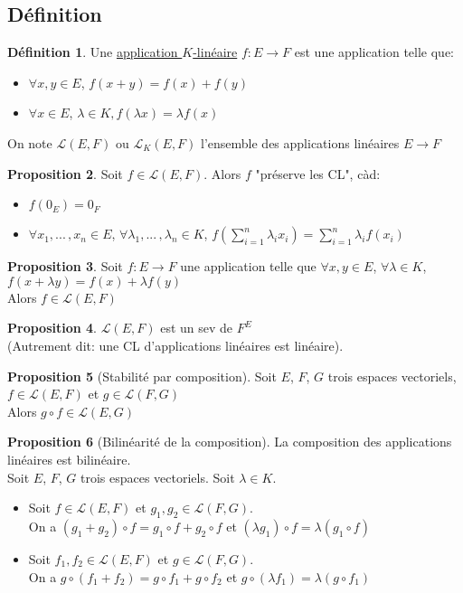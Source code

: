\documentclass[10pt,a4paper]{article}
\theoremstyle{definition}
\newtheorem{proposition}{Proposition}[section]
\newtheorem{definition}[proposition]{Définition}
\begin{document}
\subsection{Définition}
\begin{definition}
Une \uline{application $K$-linéaire} $f: E \to F$ est une application telle que:
\begin{itemize}
\item $\forall x, y \in E$, $f(x + y) = f(x) + f(y)$
\item $\forall x \in E$, $\lambda \in K, f(\lambda x) = \lambda f(x)$
\end{itemize}
On note $\mathcal{L}(E, F)$ ou $\mathcal{L}_K(E, F)$ l'ensemble des applications linéaires $E \to F$
\end{definition}
\begin{proposition}
Soit $f \in \mathcal{L}(E, F)$. Alors $f$ "préserve les CL", càd:
\begin{itemize}
\item $f(0_E) = 0_F$
\item $\forall x_1, ...\, , x_n \in E$, $\forall \lambda_1, ...\, , \lambda_n \in K$, $f(\sum\limits_{i = 1}^{n} \lambda_i x_i ) = \sum\limits_{i = 1}^{n} \lambda_i f(x_i)$
\end{itemize}
\end{proposition}
\begin{proposition}
Soit $f: E \to F$ une application telle que $\forall x, y \in E$, $\forall \lambda \in K$, $f(x + \lambda y) = f(x) + \lambda f(y)$ \\
Alors $f \in \mathcal{L}(E, F)$
\end{proposition}
\begin{proposition}
$\mathcal{L}(E, F)$ est un sev de $F^E$ \\
(Autrement dit: une CL d'applications linéaires est linéaire).
\end{proposition}
\begin{proposition}[Stabilité par composition]
Soit $E$, $F$, $G$ trois espaces vectoriels, $f \in \mathcal{L}(E, F)$ et $g \in \mathcal{L}(F, G)$ \\
Alors $g \circ f \in \mathcal{L}(E, G)$
\end{proposition}
\begin{proposition}[Bilinéarité de la composition]
La composition des applications linéaires est bilinéaire. \\
Soit $E$, $F$, $G$ trois espaces vectoriels. Soit $\lambda \in K$.
\begin{itemize}
\item Soit $f \in \mathcal{L}(E, F)$ et $g_1, g_2 \in \mathcal{L}(F, G)$. \\
On a $(g_1 + g_2) \circ f = g_1 \circ f + g_2 \circ f$ et $(\lambda g_1) \circ f = \lambda (g_1 \circ f)$
\item Soit $f_1, f_2 \in \mathcal{L}(E, F)$ et $g \in \mathcal{L}(F, G)$. \\
On a $g \circ (f_1 + f_2) = g \circ f_1 + g \circ f_2$ et $g \circ (\lambda f_1) = \lambda (g \circ f_1)$
\end{itemize}
\end{proposition}
\end{document}
